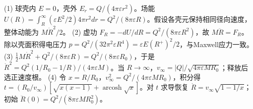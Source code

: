 (1) 球壳内 \(E=0\)，壳外 \(E_r=Q/(4\pi\varepsilon r^2)\)。场能 \(U(R)=\int_R^\infty(\varepsilon E^2/2)4\pi r^2dr=Q^2/(8\pi\varepsilon R)\)。假设各壳元保持相同径向速度，整体动能为 \(M\dot R^2/2\)。
(2) 虚功 \(F_R=-dU/dR=Q^2/(8\pi\varepsilon R^2)\)，故 \(M\ddot R=F_R\)。除以壳面积得电压力 \(p=Q^2/(32\pi^2\varepsilon R^4)=\varepsilon E(R^+)^2/2\)，与Maxwell应力一致。
(3) \(\frac12M\dot R^2+Q^2/(8\pi\varepsilon R)=Q^2/(8\pi\varepsilon R_0)\)，于是 \(\dot R^2=Q^2(1/R_0-1/R)/(4\pi\varepsilon M)\)。当 \(R\to\infty\)，\(v_\infty=|Q|/\sqrt{4\pi\varepsilon MR_0}\)；释放后选正速度根。
(4) 令 \(x=R/R_0\)，\(v_\infty^2=Q^2/(4\pi\varepsilon MR_0)\)，积分得 \(t=(R_0/v_\infty)[\sqrt{x(x-1)}+\operatorname{arcosh}\sqrt{x}]\)。对 \(t\) 求导恢复 \(\dot R=v_\infty\sqrt{1-1/x}\)；初始 \(\ddot R(0)=Q^2/(8\pi\varepsilon MR_0^2)\)。
